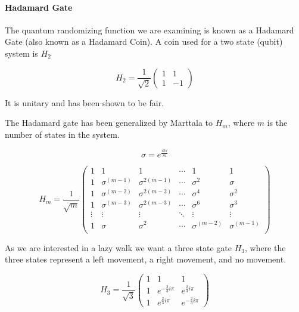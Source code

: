 \documentclass[a0,portrait]{a0poster}
\begin{document}
\begin{center}
{\paragraph{Hadamard Gate}

The quantum randomizing function we are examining is known as a Hadamard Gate (also known as a Hadamard Coin). A coin used for a two state (qubit) system is $H_2$ 

\begin{equation}
H_2 = \dfrac{1}{\sqrt{2}} \begin{pmatrix}
  1 & 1 \\
  1 & -1 
\end{pmatrix}
\label{eq:1}
\end{equation}

It is unitary and has been shown\cite{Ke:2003} to be fair. 

The Hadamard gate has been generalized by Marttala\cite{Ma:2007} to $H_m$, where $m$ is the number of states in the system. 

\begin{equation}
\sigma = e^\frac{i2\pi}{m}
\label{eq:2}
\end{equation}

\begin{equation}
H_m = \dfrac{1}{\sqrt{m}} \begin{pmatrix}
  1 & 1 & 1 & \cdots & 1 & 1 \\
  1 & \sigma^{(m-1)} & \sigma^{2(m-1)} & \cdots & \sigma^2 & \sigma \\
  1 & \sigma^{(m-2)} & \sigma^{2(m-2)} & \cdots & \sigma^4 & \sigma^2 \\
  1 & \sigma^{(m-3)} & \sigma^{2(m-3)} & \cdots & \sigma^6 & \sigma^3 \\
  \vdots  & \vdots  & \vdots  & \ddots & \vdots  & \vdots  \\
  1 & \sigma & \sigma^2 & \cdots & \sigma^{(m-2)} & \sigma^{(m-1)} \\
\end{pmatrix}
\label{eq:3}
\end{equation}

As we are interested in a lazy walk we want a three state gate $H_3$, where the three states represent a left movement, a right movement, and no movement.

\begin{equation}
H_3 = \dfrac{1}{\sqrt{3}} \begin{pmatrix}
  1 & 1 & 1 \\
  1 & e^{-\frac{2}{3}i\pi} & e^{\frac{2}{3}i\pi} \\
  1 & e^{\frac{2}{3}i\pi} & e^{-\frac{2}{3}i\pi}
\end{pmatrix}
\label{eq:4}
\end{equation}

}
\end{center}
\end{document}
